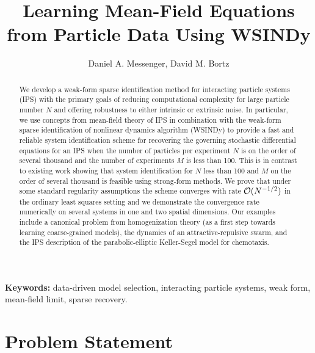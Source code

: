\documentclass[english,reqno]{amsart}
\begin{document}
%
%

\title{Learning Mean-Field Equations from Particle Data Using WSINDy}
\author{Daniel A. Messenger, David M. Bortz}
\maketitle


\begin{abstract}
We develop a weak-form sparse identification method for interacting particle systems (IPS) with the primary goals of reducing computational complexity for large particle number $N$ and offering robustness to either intrinsic or extrinsic noise. In particular, we use concepts from mean-field theory of IPS in combination with the weak-form sparse identification of nonlinear dynamics algorithm (WSINDy) to provide a fast and reliable system identification scheme for recovering the governing stochastic differential equations for an IPS when the number of particles per experiment $N$ is on the order of several thousand and the number of experiments $M$ is less than 100. This is in contrast to existing work showing that system identification for $N$ less than 100 and $M$ on the order of several thousand is feasible using strong-form methods. We prove that under some standard regularity assumptions the scheme converges with rate ${\mathcal{O}}(N^{-1/2})$ in the ordinary least squares setting and we demonstrate the convergence rate numerically on several systems in one and two spatial dimensions. Our examples include a canonical problem from homogenization theory (as a first step towards learning coarse-grained models), the dynamics of an attractive-repulsive swarm, and the IPS description of the parabolic-elliptic Keller-Segel model for chemotaxis. 

\end{abstract}


{\small {\bf Keywords: }data-driven model selection, interacting particle systems, weak form, mean-field limit, sparse recovery.}

\section{Problem Statement}\label{sec:problem_statement}
\end{document}
